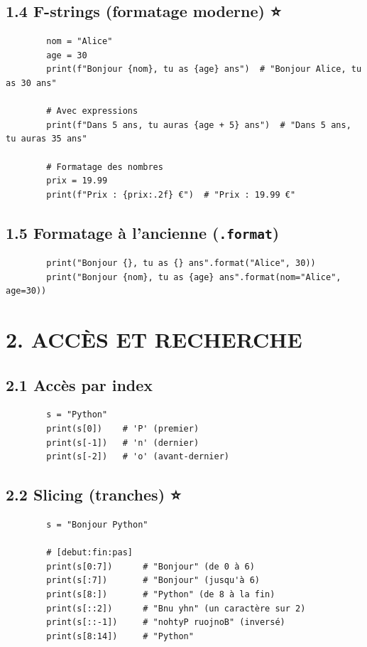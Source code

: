 \documentclass[12pt,a4paper]{article}
\begin{document}
	\subsection*{\color{cyan}1.4 F-strings (formatage moderne) ⭐}
	\begin{lstlisting}
		nom = "Alice"
		age = 30
		print(f"Bonjour {nom}, tu as {age} ans")  # "Bonjour Alice, tu as 30 ans"
		
		# Avec expressions
		print(f"Dans 5 ans, tu auras {age + 5} ans")  # "Dans 5 ans, tu auras 35 ans"
		
		# Formatage des nombres
		prix = 19.99
		print(f"Prix : {prix:.2f} €")  # "Prix : 19.99 €"
	\end{lstlisting}
	
	\subsection*{\color{cyan}1.5 Formatage à l'ancienne (\texttt{.format})}
	\begin{lstlisting}
		print("Bonjour {}, tu as {} ans".format("Alice", 30))
		print("Bonjour {nom}, tu as {age} ans".format(nom="Alice", age=30))
	\end{lstlisting}
	
	\section*{\color{orange}2. ACCÈS ET RECHERCHE}
	
	\subsection*{\color{cyan}2.1 Accès par index}
	\begin{lstlisting}
		s = "Python"
		print(s[0])    # 'P' (premier)
		print(s[-1])   # 'n' (dernier)
		print(s[-2])   # 'o' (avant-dernier)
	\end{lstlisting}
	
	\subsection*{\color{cyan}2.2 Slicing (tranches) ⭐}
	\begin{lstlisting}
		s = "Bonjour Python"
		
		# [debut:fin:pas]
		print(s[0:7])      # "Bonjour" (de 0 à 6)
		print(s[:7])       # "Bonjour" (jusqu'à 6)
		print(s[8:])       # "Python" (de 8 à la fin)
		print(s[::2])      # "Bnu yhn" (un caractère sur 2)
		print(s[::-1])     # "nohtyP ruojnoB" (inversé)
		print(s[8:14])     # "Python"
	\end{lstlisting}
	
\end{document}
